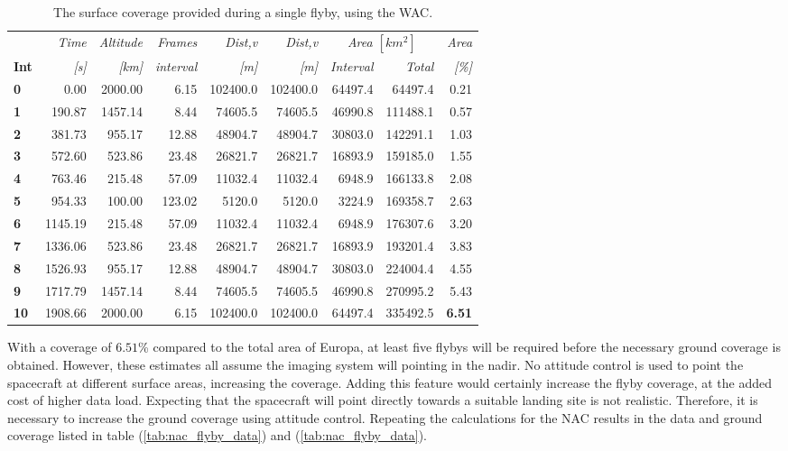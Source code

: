 \begin{table}[htb]
  \centering
    \begin{tabular}{l|r|r|r|r|r|r|r|r|}
      & \textit{Time} & \textit{Altitude} & \textit{Frames} & \textit{Dist,v} & \textit{Dist,v} & \multicolumn{2}{c|}{\textit{Area $[km^2]$}} & \multicolumn{1}{r}{\textit{Area}} \\
\textbf{Int} & \textit{[s]} & \textit{[km]} & \textit{interval} & \textit{[m]} & \textit{[m]} & \textit{Interval} & \textit{Total} & \multicolumn{1}{r}{\textit{[\%]}} \bigstrut[b]\\
\hline
\textbf{0} & 0.00  & 2000.00 & 6.15  & 102400.0 & 102400.0 & 64497.4 & 64497.4 & 0.21 \bigstrut[t]\\
\textbf{1} & 190.87 & 1457.14 & 8.44  & 74605.5 & 74605.5 & 46990.8 & 111488.1 & 0.57 \\
\textbf{2} & 381.73 & 955.17 & 12.88 & 48904.7 & 48904.7 & 30803.0 & 142291.1 & 1.03 \\
\textbf{3} & 572.60 & 523.86 & 23.48 & 26821.7 & 26821.7 & 16893.9 & 159185.0 & 1.55 \\
\textbf{4} & 763.46 & 215.48 & 57.09 & 11032.4 & 11032.4 & 6948.9 & 166133.8 & 2.08 \\
\textbf{5} & 954.33 & 100.00 & 123.02 & 5120.0 & 5120.0 & 3224.9 & 169358.7 & 2.63 \\
\textbf{6} & 1145.19 & 215.48 & 57.09 & 11032.4 & 11032.4 & 6948.9 & 176307.6 & 3.20 \\
\textbf{7} & 1336.06 & 523.86 & 23.48 & 26821.7 & 26821.7 & 16893.9 & 193201.4 & 3.83 \\
\textbf{8} & 1526.93 & 955.17 & 12.88 & 48904.7 & 48904.7 & 30803.0 & 224004.4 & 4.55 \\
\textbf{9} & 1717.79 & 1457.14 & 8.44  & 74605.5 & 74605.5 & 46990.8 & 270995.2 & 5.43 \\
\textbf{10} & 1908.66 & 2000.00 & 6.15  & 102400.0 & 102400.0 & 64497.4 & 335492.5 & \textbf{6.51} \\
\end{tabular}%
  \caption{The surface coverage provided during a single flyby, using the WAC.}
  \label{tab:wac_flyby_coverage}%
\end{table}%
With a coverage of $6.51$\% compared to the total area of Europa, at least five flybys will be required before the necessary ground coverage is obtained. However, these estimates all assume the imaging system will pointing in the nadir. No attitude control is used to point the spacecraft at different surface areas, increasing the coverage. Adding this feature would certainly increase the flyby coverage, at the added cost of higher data load. Expecting that the spacecraft will point directly towards a suitable landing site is not realistic. Therefore, it is necessary to increase the ground coverage using attitude control. Repeating the calculations for the NAC results in the data and ground coverage listed in table (\ref{tab:nac_flyby_data}) and (\ref{tab:nac_flyby_data}).
